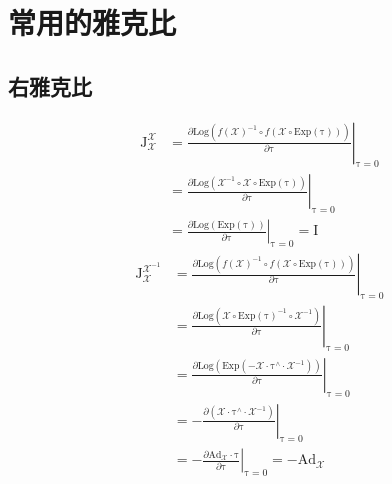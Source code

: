 \documentclass[12pt, onecolumn]{article}
\newcommand\normf{\fangsong}
\newcommand\liehat[1]{#1^{\land}}
\newcommand\Exp[1]{\mathrm{Exp}\left( #1\right) }
\newcommand\Log[1]{\mathrm{Log}\left( #1\right) }
\newcommand\bsm[1]{\boldsymbol{\mathrm{#1}}}
\begin{document}
	\section{\normf 常用的雅克比}
	\subsection{\normf 右雅克比}
	\vspace{5mm}
	\begin{equation}
	\begin{aligned}
	\bsm{J}_{\mathcal{X}}^{\mathcal{X}}&=
	\left. \frac{\partial \Log{f(\mathcal{X})^{-1}\circ f(\mathcal{X}\circ\Exp{\bsm\tau})}}{\partial \bsm{\tau}}\right|_{\bsm{\tau}=0}
	\\&=\left. \frac{\partial \Log{\mathcal{X}^{-1}\circ \mathcal{X}\circ\Exp{\bsm\tau}}}{\partial \bsm{\tau}}\right|_{\bsm{\tau}=0}
	\\&=\left. \frac{\partial \Log{\Exp{\bsm\tau}}}{\partial \bsm{\tau}}\right|_{\bsm{\tau}=0}=\bsm{I}
	\end{aligned}
	\end{equation}
	\vspace{5mm}
	\begin{equation}
	\begin{aligned}
	\bsm{J}_{\mathcal{X}}^{\mathcal{X}^{-1}}&=
	\left. \frac{\partial \Log{f(\mathcal{X})^{-1}\circ f(\mathcal{X}\circ\Exp{\bsm\tau})}}{\partial \bsm{\tau}}\right|_{\bsm{\tau}=0}
	\\&=\left. \frac{
	\partial \Log{\mathcal{X}\circ\Exp{\bsm\tau}^{-1}\circ\mathcal{X}^{-1}}
	}{\partial \bsm{\tau}}\right|_{\bsm{\tau}=0}
	\\&=\left. \frac{
		\partial \Log{\Exp{-\mathcal{X}\cdot\liehat{\bsm\tau}\cdot\mathcal{X}^{-1}}}
		}{\partial \bsm{\tau}}\right|_{\bsm{\tau}=0}
	\\&=-\left. \frac{
		\partial \left( \mathcal{X}\cdot\liehat{\bsm\tau}\cdot\mathcal{X}^{-1}\right) 
		}{\partial \bsm{\tau}}\right|_{\bsm{\tau}=0}
	\\&=-\left. \frac{
		\partial \bsm{Ad}_{\mathcal{X}}\cdot\bsm{\tau} 
		}{\partial \bsm{\tau}}\right|_{\bsm{\tau}=0}=-\bsm{Ad}_{\mathcal{X}}
	\end{aligned}
	\end{equation}
	\vspace{5mm}
\end{document}
